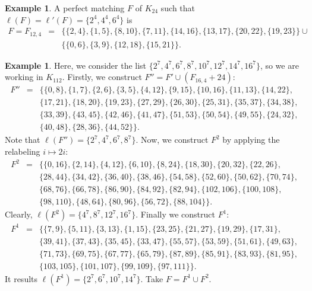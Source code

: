 \documentclass{amsart}
\theoremstyle{definition}
\newtheorem{ex}[defi]{Example}
\numberwithin{equation}{section}
\begin{document}
\begin{ex}\label{ex:even}
A perfect matching $F$ of $K_{24}$ such that $\ell(F)=\ell'(F)=\{2^4,4^4,6^4\}$ is
$$\begin{array}{rcl}
F=F_{12,4} &=&\{\{2,4\},\{1,5\},\{8,10\},\{7,11\},\{14,16\},\{13,17\},\{20,22\},\{19,23\}\}\cup\\
&&\{\{0,6\},\{3,9\},\{12,18\},\{15,21\}\}.
\end{array}$$
\end{ex}

\begin{ex}
Here, we consider the list $\{2^7,4^7,6^7,8^7,10^7,12^7,14^7,16^7\}$, so we are working in $K_{112}$.
Firstly, we construct $F''=F'\cup (F_{16,4}+24)$:
$$\begin{array}{rcl}
F''&=&\{\{0,8\},\{1,7\},\{2,6\},\{3,5\},\{4,12\},\{9,15\},\{10,16\},\{11,13\},\{14,22\},\\
&& \{17,21\},\{18,20\},\{19,23\},\{27,29\},\{26,30\},\{25,31\},\{35,37\},\{34,38\},\\
&&\{33,39\},\{43,45\},\{42,46\},\{41,47\},\{51,53\},\{50,54\},\{49,55\},\{24,32\},\\
&& \{40,48\},\{28,36\},\{44,52\}\}.
\end{array}$$
Note that $\ell(F'')=\{2^7,4^7,6^7,8^7\}$.
Now, we construct $F^2$ by applying the relabeling $i\mapsto 2i$:
$$\begin{array}{rcl}
F^2&=&\{\{0,16\},\{2,14\},\{4,12\},\{6,10\},\{8,24\},\{18,30\},\{20,32\},\{22,26\},\\
&& \{28,44\},\{34,42\},\{36,40\},\{38,46\},\{54,58\},\{52,60\},\{50,62\},\{70,74\},\\
&& \{68,76\},\{66,78\},\{86,90\},\{84,92\}, \{82,94\},\{102,106\},\{100,108\},\\
&& \{98,110\},\{48,64\},\{80,96\},\{56,72\},\{88,104\}\}.
\end{array}$$
Clearly, $\ell(F^2)=\{4^7,8^7,12^7,16^7\}$.
Finally we construct $F^1$:
$$\begin{array}{rcl}
F^1&=&\{\{7,9\},\{5,11\},\{3,13\},\{1,15\},\{23,25\},\{21,27\},\{19,29\},\{17,31\},\\
&&\{39,41\},\{37,43\},\{35,45\},\{33,47\},\{55,57\},\{53,59\},\{51,61\},\{49,63\},\\
&&\{71,73\},\{69,75\},\{67,77\},\{65,79\},\{87,89\},\{85,91\},\{83,93\},\{81,95\},\\
&&\{103,105\},\{101,107\},\{99,109\},\{97,111\}\}.
\end{array}$$
It results $\ell(F^1)=\{2^7,6^7,10^7,14^7\}$.
Take $F=F^1\cup F^2$. 
\end{ex}
\end{document}
